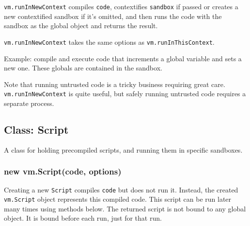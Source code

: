 \texttt{vm.runInNewContext} compiles \texttt{code}, contextifies
\texttt{sandbox} if passed or creates a new contextified sandbox if it's
omitted, and then runs the code with the sandbox as the global object
and returns the result.

\texttt{vm.runInNewContext} takes the same options as
\texttt{vm.runInThisContext}.

Example: compile and execute code that increments a global variable and
sets a new one. These globals are contained in the sandbox.

\begin{Shaded}
\begin{Highlighting}[]
 \NormalTok{);}
 \NormalTok{),}

 
  \NormalTok{: }\NormalTok{,}
  \NormalTok{: }
\NormalTok{\};}

\NormalTok{(}
\NormalTok{(}

\end{Highlighting}
\end{Shaded}

Note that running untrusted code is a tricky business requiring great
care. \texttt{vm.runInNewContext} is quite useful, but safely running
untrusted code requires a separate process.

\subsection{Class: Script}

A class for holding precompiled scripts, and running them in specific
sandboxes.

\subsubsection{new vm.Script(code, options)}

Creating a new \texttt{Script} compiles \texttt{code} but does not run
it. Instead, the created \texttt{vm.Script} object represents this
compiled code. This script can be run later many times using methods
below. The returned script is not bound to any global object. It is
bound before each run, just for that run.

